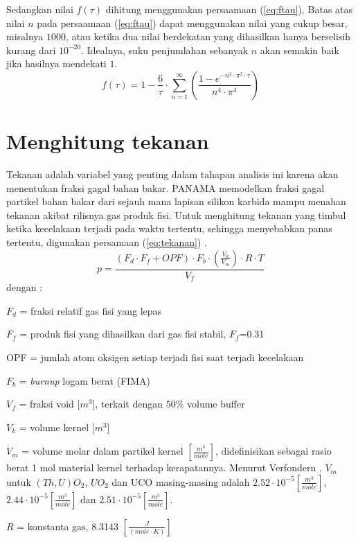 \documentclass[a4paper,11pt]{report}
\begin{document}
Sedangkan nilai $f(\tau)$ dihitung menggunakan persaamaan (\ref{eq:ftau}). Batas atas nilai $n$ pada persaamaan (\ref{eq:ftau}) dapat menggunakan nilai yang cukup besar, misalnya $1000$, atau ketika dua nilai berdekatan yang dihasilkan hanya berselisih kurang dari $10^{-20}$. Idealnya, suku penjumlahan sebanyak $n$ akan semakin baik jika hasilnya mendekati $1$.
\begin{equation}
  f(\tau)=1-\frac{6}{\tau} \cdot \sum_{n=1}^{\infty} \left( \frac{1-e^{-n^2 \cdot \pi^2 \cdot \tau}}{n^4 \cdot \pi^4} \right)
  \label{eq:ftau}
\end{equation}


\section{Menghitung tekanan}
Tekanan adalah variabel yang penting dalam tahapan analisis ini karena akan menentukan fraksi gagal bahan bakar. PANAMA \cite{report1} memodelkan fraksi gagal partikel bahan bakar dari sejauh mana lapisan silikon karbida mampu menahan tekanan akibat rilisnya gas produk fisi. Untuk menghitung tekanan yang timbul ketika kecelakaan terjadi pada waktu tertentu, sehingga menyebabkan panas tertentu, digunakan persamaan (\ref{eq:tekanan}) \cite{report1}. 
\begin{equation}
  p=\frac{(F_d \cdot F_f + OPF) \cdot F_b \cdot (\frac{V_k}{V_m}) \cdot R \cdot T}{ V_f}
  \label{eq:tekanan}
\end{equation}
dengan :
\begin{description}
  \item $F_d$ = fraksi relatif gas fisi yang lepas 
  \item $F_f$ = produk fisi yang dihasilkan dari gas fisi stabil, $F_f$=0.31
  \item OPF = jumlah atom oksigen setiap terjadi fisi saat terjadi kecelakaan
  \item $F_b$ = \textit{burnup} logam berat (FIMA)
  \item $V_f$ = fraksi void [$m^3$], terkait dengan $50\%$ volume buffer 
  \item $V_k$ = volume kernel [$m^3$]
  \item $V_m$ = volume molar dalam partikel kernel $\left[\frac{m^3}{mole} \right]$, didefinisikan sebagai rasio berat 1 mol material kernel terhadap kerapatannya. Menurut Verfondern \cite{report1}, $V_m$ untuk $(Th,U)O_2$, $UO_2$ dan UCO masing-masing adalah $2.52 \cdot 10^{-5}[\frac{m^3}{mole}]$, $2.44 \cdot 10^{-5}[\frac{m^3}{mole}]$ dan $2.51 \cdot 10^{-5}[\frac{m^3}{mole}]$.
  \item $R$ = konstanta gas, 8.3143 $\left[\frac{J}{(mole \cdot K)} \right]$
\end{description}
\end{document}
